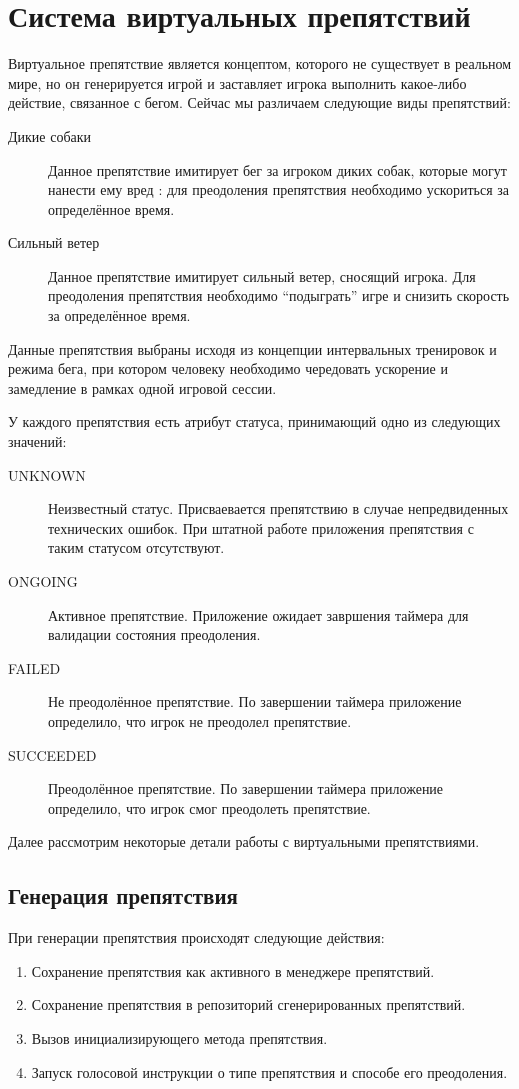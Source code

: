 \section{Система виртуальных препятствий}
\label{sec:obstacles}
Виртуальное препятствие является концептом, которого не существует в реальном мире, но он генерируется игрой и заставляет игрока выполнить какое-либо действие, связанное с бегом. Сейчас мы различаем следующие виды препятствий:
\begin{description}
	\item[Дикие собаки] Данное препятствие имитирует бег за игроком диких собак, которые могут нанести ему вред : для преодоления препятствия необходимо ускориться за определённое время.
	\item[Сильный ветер] Данное препятствие имитирует сильный ветер, сносящий игрока. Для преодоления препятствия необходимо ``подыграть'' игре и снизить скорость за определённое время.
\end{description}
\smallskip
Данные препятствия выбраны исходя из концепции интервальных тренировок и режима бега, при котором человеку необходимо чередовать ускорение и замедление в рамках одной игровой сессии.

У каждого препятствия есть атрибут статуса, принимающий одно из следующих значений:
\begin{description}
	\item[UNKNOWN] Неизвестный статус. Присваевается препятствию в случае непредвиденных технических ошибок. При штатной работе приложения препятствия с таким статусом отсутствуют.
	\item[ONGOING] Активное препятствие. Приложение ожидает завршения таймера для валидации состояния преодоления.
	\item[FAILED] Не преодолённое препятствие. По завершении таймера приложение определило, что игрок не преодолел препятствие.
	\item[SUCCEEDED] Преодолённое препятствие. По завершении таймера приложение определило, что игрок смог преодолеть препятствие.
\end{description}
\smallskip
Далее рассмотрим некоторые детали работы с виртуальными препятствиями.
\subsection*{Генерация препятствия}
При генерации препятствия происходят следующие действия:
\begin{enumerate}
	\item Сохранение препятствия как активного в менеджере препятствий.
	\item Сохранение препятствия в репозиторий сгенерированных препятствий.
	\item Вызов инициализирующего метода препятствия.
	\item Запуск голосовой инструкции о типе препятствия и способе его преодоления.
\end{enumerate}

